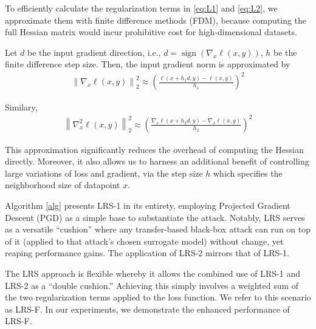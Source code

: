 \documentclass[letterpaper]{article} %
\theoremstyle{plain}
\theoremstyle{definition}
\begin{document}
To efficiently calculate the regularization terms in \eqref{eq:L1} and \eqref{eq:L2}, we approximate them with finite difference methods (FDM), because computing the full Hessian matrix would incur prohibitive cost for high-dimensional datasets.

Let $d$ be the input gradient direction, i.e., $d=\operatorname{sign}(\nabla_x \ell(x, y))$, %
$h$ be the finite difference step size. Then, the input gradient norm is approximated by
\begin{align}
\left\|\nabla_x \ell(x, y)\right\|_2^2 \approx\left(\frac{\ell(x+h_1 d, y)-\ell(x, y)}{h_1}\right)^2
\end{align}

Similary,
\begin{align}
\left\|\nabla_{x}^{2} \ell(x, y)\right\|_2^2 \approx\left(\frac{\nabla_{x}\ell(x+h_2 d, y)-\nabla_{x}\ell(x, y)}{h_2}\right)^2
\end{align}

This approximation significantly reduces the overhead of computing the Hessian directly. Moreover, it also allows us to harness an additional benefit of controlling large variations of loss and gradient, via the step size $h$ which specifies the neighborhood size of datapoint $x$.

Algorithm \ref{alg} presents LRS-1 in its entirety, employing Projected Gradient Descent (PGD) \cite{madry2018pgd} as a simple base to substantiate the attack. Notably, LRS serves as a versatile ``cushion'' where any transfer-based black-box attack can run on top of it (applied to that attack's chosen surrogate model) without change, yet reaping performance gains. The application of LRS-2 mirrors that of LRS-1.

The LRS approach is flexible whereby it allows the combined use of LRS-1 and LRS-2 as a ``double cushion.'' Achieving this simply involves a weighted sum of the two regularization terms applied to the loss function. We refer to this scenario as LRS-F. In our experiments, we demonstrate the enhanced performance of LRS-F.
\end{document}
